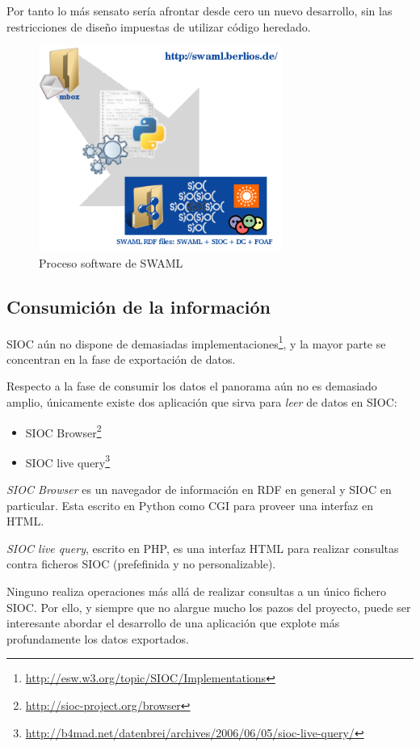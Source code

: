 Por tanto lo más sensato sería afrontar desde cero un nuevo desarrollo, sin las 
restricciones de diseño impuestas de utilizar código heredado.

\begin{figure}[H]
	\centering
	\includegraphics[width=8cm]{images/swaml-process.png}
	\caption{Proceso software de SWAML}
	\label{fig:swamlProcess}
\end{figure}


\subsection{Consumición de la información}

SIOC aún no dispone de demasiadas implementaciones\footnote{\url{http://esw.w3.org/topic/SIOC/Implementations}},
y la mayor parte se concentran en la fase de exportación de datos. 

Respecto a la fase de consumir los datos el panorama aún no es demasiado amplio,
únicamente existe dos aplicación que sirva para \emph{leer} de datos en SIOC:

\begin{itemize}
 \item SIOC Browser\footnote{\url{http://sioc-project.org/browser}}
 \item SIOC live query\footnote{\url{http://b4mad.net/datenbrei/archives/2006/06/05/sioc-live-query/}}
\end{itemize}

\emph{SIOC Browser} es un navegador de información en RDF en general y SIOC en 
particular. Esta escrito en Python como CGI para proveer una interfaz en HTML.

\emph{SIOC live query}, escrito en PHP, es una interfaz HTML para realizar consultas
contra ficheros SIOC (prefefinida y no personalizable).

Ninguno realiza operaciones más allá de realizar consultas a un único fichero 
SIOC. Por ello, y siempre que no alargue mucho los pazos del proyecto, puede ser 
interesante abordar el desarrollo de una aplicación que explote más profundamente
los datos exportados.
